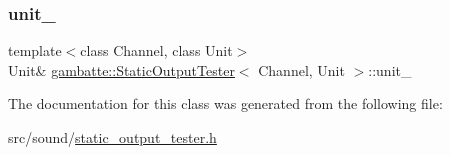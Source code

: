 \mbox{\label{classgambatte_1_1StaticOutputTester_a23bbc293070a93e9b1d1071590ffb936}} 
\subsubsection{\texorpdfstring{unit\+\_\+}{unit\_}}
{\footnotesize\ttfamily template$<$class Channel, class Unit$>$ \\
Unit\& \hyperlink{classgambatte_1_1StaticOutputTester}{gambatte\+::\+Static\+Output\+Tester}$<$ Channel, Unit $>$\+::unit\+\_\+\hspace{0.3cm}{\ttfamily [private]}}



The documentation for this class was generated from the following file\+:\begin{DoxyCompactItemize}
\item 
src/sound/\hyperlink{static__output__tester_8h}{static\+\_\+output\+\_\+tester.\+h}\end{DoxyCompactItemize}
